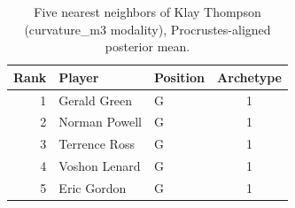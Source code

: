 \begin{table}[htbp]
  \centering\small
  \begin{tabular}{rllc}
    \toprule
    Rank & Player & Position & Archetype \\
    \midrule
    1 & Gerald Green & G & 1 \\
    2 & Norman Powell & G & 1 \\
    3 & Terrence Ross & G & 1 \\
    4 & Voshon Lenard & G & 1 \\
    5 & Eric Gordon & G & 1 \\
    \bottomrule
  \end{tabular}
  \caption{Five nearest neighbors of Klay Thompson (curvature_m3 modality), Procrustes-aligned posterior mean.}
  \label{tab:Klay_Thompson_neighbors_curvature_m3}
\end{table}

